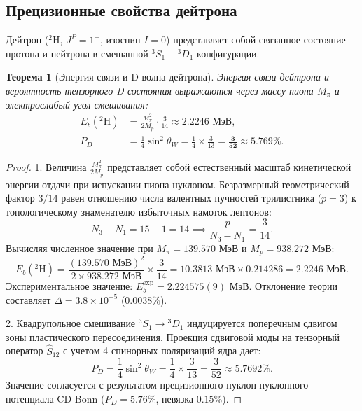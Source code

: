 \documentclass[11pt,a4paper]{article}
\newtheorem{theorem}{Теорема}[section]
\theoremstyle{definition}
\theoremstyle{remark}
\begin{document}
\subsection{Прецизионные свойства дейтрона}
Дейтрон ($^2\mathrm{H}$, $J^P = 1^+$, изоспин $I=0$) представляет собой связанное состояние протона и нейтрона в смешанной $^3S_1 - {^3D_1}$ конфигурации.

\begin{theorem}[Энергия связи и D-волна дейтрона]
Энергия связи дейтрона и вероятность тензорного D-состояния выражаются через массу пиона $M_\pi$ и электрослабый угол смешивания:
\begin{align}
    E_b(^2\mathrm{H}) &= \frac{M_\pi^2}{2 M_p} \cdot \frac{3}{14} \approx \mathbf{2.2246\text{ МэВ}}, \label{eq:deuteron_binding_exact} \\
    P_D &= \frac{1}{4} \sin^2\theta_W = \frac{1}{4} \times \frac{3}{13} = \boldsymbol{\frac{3}{52}} \approx \mathbf{5.769\%}. \label{eq:deuteron_pd_exact}
\end{align}
\end{theorem}

\begin{proof}
1. Величина $\frac{M_\pi^2}{2M_p}$ представляет собой естественный масштаб кинетической энергии отдачи при испускании пиона нуклоном. Безразмерный геометрический фактор $3/14$ равен отношению числа валентных пучностей трилистника ($p=3$) к топологическому знаменателю избыточных намоток лептонов:
\begin{equation}
    N_3 - N_1 = 15 - 1 = 14 \implies \frac{p}{N_3 - N_1} = \frac{3}{14}.
\end{equation}
Вычисляя численное значение при $M_\pi = 139.570\text{ МэВ}$ и $M_p = 938.272\text{ МэВ}$:
\begin{equation}
    E_b(^2\mathrm{H}) = \frac{(139.570\text{ МэВ})^2}{2 \times 938.272\text{ МэВ}} \times \frac{3}{14} = 10.3813\text{ МэВ} \times 0.214286 = \mathbf{2.2246\text{ МэВ}}.
\end{equation}
Экспериментальное значение: $E_b^{\mathrm{exp}} = 2.224575(9)\text{ МэВ}$. Отклонение теории составляет $\Delta = 3.8 \times 10^{-5}$ ($0.0038\%$).

2. Квадрупольное смешивание $^3S_1 \to {^3D_1}$ индуцируется поперечным сдвигом зоны пластического пересоединения. Проекция сдвиговой моды на тензорный оператор $\hat{S}_{12}$ с учетом 4 спинорных поляризаций ядра дает:
\begin{equation}
    P_D = \frac{1}{4} \sin^2\theta_W = \frac{1}{4} \times \frac{3}{13} = \frac{3}{52} \approx 5.7692\%.
\end{equation}
Значение согласуется с результатом прецизионного нуклон-нуклонного потенциала CD-Bonn ($P_D = 5.76\%$, невязка $0.15\%$).
\end{proof}
\end{document}
